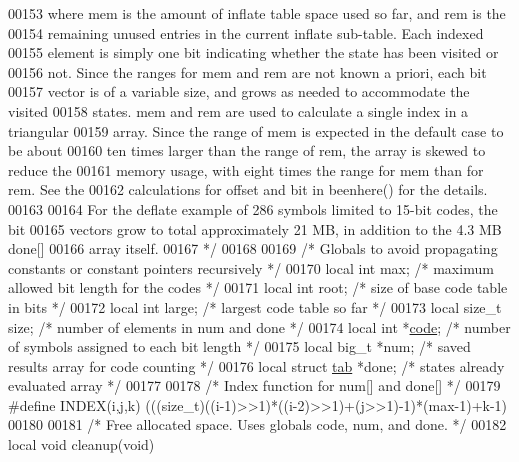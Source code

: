 \begin{DoxyCode}
00153 \textcolor{comment}{   where mem is the amount of inflate table space used so far, and rem is the}
00154 \textcolor{comment}{   remaining unused entries in the current inflate sub-table.  Each indexed}
00155 \textcolor{comment}{   element is simply one bit indicating whether the state has been visited or}
00156 \textcolor{comment}{   not.  Since the ranges for mem and rem are not known a priori, each bit}
00157 \textcolor{comment}{   vector is of a variable size, and grows as needed to accommodate the visited}
00158 \textcolor{comment}{   states.  mem and rem are used to calculate a single index in a triangular}
00159 \textcolor{comment}{   array.  Since the range of mem is expected in the default case to be about}
00160 \textcolor{comment}{   ten times larger than the range of rem, the array is skewed to reduce the}
00161 \textcolor{comment}{   memory usage, with eight times the range for mem than for rem.  See the}
00162 \textcolor{comment}{   calculations for offset and bit in beenhere() for the details.}
00163 \textcolor{comment}{}
00164 \textcolor{comment}{   For the deflate example of 286 symbols limited to 15-bit codes, the bit}
00165 \textcolor{comment}{   vectors grow to total approximately 21 MB, in addition to the 4.3 MB done[]}
00166 \textcolor{comment}{   array itself.}
00167 \textcolor{comment}{ */}
00168 
00169 \textcolor{comment}{/* Globals to avoid propagating constants or constant pointers recursively */}
00170 local \textcolor{keywordtype}{int} max;          \textcolor{comment}{/* maximum allowed bit length for the codes */}
00171 local \textcolor{keywordtype}{int} root;         \textcolor{comment}{/* size of base code table in bits */}
00172 local \textcolor{keywordtype}{int} large;        \textcolor{comment}{/* largest code table so far */}
00173 local \textcolor{keywordtype}{size\_t} size;      \textcolor{comment}{/* number of elements in num and done */}
00174 local \textcolor{keywordtype}{int} *\hyperlink{structcode}{code};        \textcolor{comment}{/* number of symbols assigned to each bit length */}
00175 local big\_t *num;       \textcolor{comment}{/* saved results array for code counting */}
00176 local \textcolor{keyword}{struct }\hyperlink{structtab}{tab} *done; \textcolor{comment}{/* states already evaluated array */}
00177 
00178 \textcolor{comment}{/* Index function for num[] and done[] */}
00179 \textcolor{preprocessor}{#define INDEX(i,j,k) (((size\_t)((i-1)>>1)*((i-2)>>1)+(j>>1)-1)*(max-1)+k-1)}
00180 
00181 \textcolor{comment}{/* Free allocated space.  Uses globals code, num, and done. */}
00182 local \textcolor{keywordtype}{void} cleanup(\textcolor{keywordtype}{void})

\end{DoxyCode}
